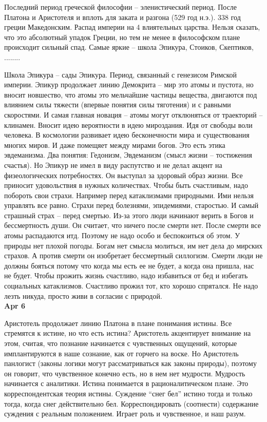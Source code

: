 \documentclass[a4paper, 12pt]{article}
\begin{document}
Последний период греческой философии -- эленистический период. После Платона и Аристотеля и вплоть для заката и разгона (529 год н.э.). 338 год греции Македонским. Распад империи на 4 влиятельных царства. Нельзя сказать, что это абсолютный упадок Греции, но тем не менее в философском плане происходит сильный спад. Самые яркие -- школа Эпикура, Стоиков, Скептиков, ........

Школа Эпикура -- сады Эпикура. Период, связанный с генезисом Римской империи. Эпикур продолжает линию Демокрита -- мир это атомы и пустота, но вносит новшество, что атомы это мельчайшие частицы вещества, двигаются под влиянием силы тяжести (впервые понятия силы тяготения) и с равными скоростями. И самая главная новация -- атомы могут отклюняться от траекторий -- клинамен. Вносит идею вероятности в идею мироздания. Идя от свободы воли человека. В космологии развивает идею бесконечности мира и существования многих миров. И даже помещяет между мирами богов. Это есть этика эвдеманизма. Два понятия: Гедонизм, Эвдеманизм (смысл жизни -- тостижения счастья). Но Эпикур не имел в виду распутство и не делал акцент на физеологических потребностях. Он выступал за здоровый образ жизни. Все приносит удовольствия в нужных количествах. Чтобы быть счастливым, надо побороть свои страхи. Например перед катаклизмами природными. Ими нельзя управлять все равно. Страхи перед болезнями, эпидемиями, старостью. И самый страшный страх -- перед смертью. Из-за этого люди начинают верить в Богов и бессмертность души. Он считает, что ничего после смерти нет. После смерти все атомы распадаются итд. Поэтому не надо особо и беспокоиться об этом. У природы нет плохой погоды. Богам нет смысла молиться, им нет дела до мирских страхов. А против смерти он изобретает бессмертный силлогизм. Смерти люди не должны бояться потому что когда мы есть ее не будет, а когда она пришла, нас не будет. Чтобы прожить жизнь счастливо, надо избавиться от бед и избегать социальных катаклизмов. Счастливо прожил тот, кто хорошо спрятался. Не надо лезть никуда, просто живи в согласии с природой.\\

\hfill \textbf{Apr 6}

Аристотель продолжает линию Платона в плане понимания истины. Все стремятся к истине, но что есть истина? Аристотель акцентирует внимание на этом, считая, что познание начинается с чувственных ощущений, которые имплантируются в наше сознание, как от горчего на воске. Но Аристотель панлогист (законы логики могут рассматриваться как законы природы), поэтому он говорит, что чувственное конечно есть, но в нем нет мудрости. Мудрость начинается с аналитики. Истина понимается в рационалитическом плане. Это корреспондентская теория истины. Суждение ``снег бел'' истино тогда и только тогда, когда снег действительно бел. Корреспондировать (соотнести) содержание суждения с реальным положением. Играет роль и чувственное, и наш разум. 
\end{document}
